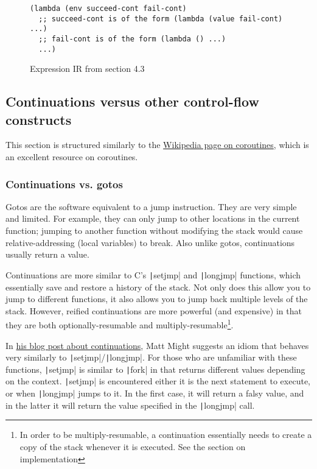\documentclass[]{article}
\begin{document}
\begin{figure}[]
  \centering
\begin{verbatim}
(lambda (env succeed-cont fail-cont)
  ;; succeed-cont is of the form (lambda (value fail-cont) ...)
  ;; fail-cont is of the form (lambda () ...)
  ...)
\end{verbatim}
  \caption{Expression IR from section 4.3}
  \label{fig:ir43}
\end{figure}

\subsection{Continuations versus other control-flow constructs}
\label{sec:cntf}

This section is structured similarly to the \href{https://en.wikipedia.org/wiki/Coroutine}{Wikipedia page on coroutines}, which is an excellent resource on coroutines.

\subsubsection{Continuations vs. gotos}
\label{sec:goto}

Gotos are the software equivalent to a jump instruction. They are very simple and limited. For example, they can only jump to other locations in the current function; jumping to another function without modifying the stack would cause relative-addressing (local variables) to break. Also unlike gotos, continuations usually return a value.

Continuations are more similar to C's \texttt|setjmp| and \texttt|longjmp| functions, which essentially save and restore a history of the stack. Not only does this allow you to jump to different functions, it also allows you to jump back multiple levels of the stack. However, reified continuations are more powerful (and expensive) in that they are both optionally-resumable and multiply-resumable\footnote{In order to be multiply-resumable, a continuation essentially needs to create a copy of the stack whenever it is executed. See the section on implementation}.

In \href{https://matt.might.net/articles/programming-with-continuations--exceptions-backtracking-search-threads-generators-coroutines/}{his blog post about continuations}, Matt Might suggests an idiom that behaves very similarly to \texttt|setjmp|/\texttt|longjmp|. For those who are unfamiliar with these functions, \texttt|setjmp| is similar to \texttt|fork| in that returns different values depending on the context. \texttt|setjmp| is encountered either it is the next statement to execute, or when \texttt|longjmp| jumps to it. In the first case, it will return a falsy value, and in the latter it will return the value specified in the \texttt|longjmp| call.
\end{document}
